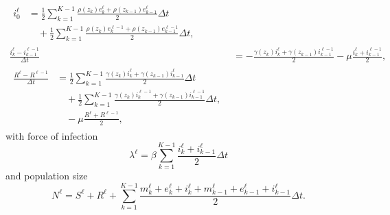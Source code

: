 \documentclass{jpmarticle}
\let\subequationsorig\subequations%
\let\endsubequationsorig\endsubequations%
\renewenvironment{subequations}{
  \subequationsorig
  \renewcommand{\theequation}{\theparentequation.\arabic{equation}}
}{
  \endsubequationsorig
}
\begin{document}
\begin{subequations}
\begin{align}
\begin{split}
      i_0^{\ell} &=
      \frac{1}{2} \sum_{k = 1}^{K - 1}
      \frac{\rho(z_k) e_k^{\ell} + \rho(z_{k - 1}) e_{k - 1}^{\ell}}{2}
      \Delta t
      \\ & \quad {}
      + \frac{1}{2} \sum_{k = 1}^{K - 1}
      \frac{\rho(z_k) e_k^{\ell - 1} + \rho(z_{k - 1}) e_{k - 1}^{\ell - 1}}{2}
      \Delta t,
    \end{split}
    \\
    \frac{i_k^{\ell} - i_{k - 1}^{\ell - 1}}{\Delta t} &=
    - \frac{\gamma(z_k) i_k^{\ell} + \gamma(z_{k - 1}) i_{k - 1}^{\ell - 1}}{2}
    - \mu \frac{i_k^{\ell} + i_{k - 1}^{\ell - 1}}{2},
    \\
    \begin{split}
      \frac{R^{\ell} - R^{\ell - 1}}{\Delta t} &=
      \frac{1}{2} \sum_{k = 1}^{K - 1}
      \frac{\gamma(z_k) i_k^{\ell} + \gamma(z_{k - 1}) i_{k - 1}^{\ell}}{2}
      \Delta t
      \\ & \quad {}
      + \frac{1}{2} \sum_{k = 1}^{K - 1}
      \frac{\gamma(z_k) i_k^{\ell - 1} + \gamma(z_{k - 1}) i_{k - 1}^{\ell - 1}}{2}
      \Delta t,
      \\ & \quad {}
      - \mu \frac{R^{\ell} + R^{\ell - 1}}{2},
    \end{split}
  \end{align}
  with force of infection
  \begin{equation}
    \lambda^{\ell} =
    \beta \sum_{k = 1}^{K - 1}
    \frac{i_k^{\ell} + i_{k - 1}^{\ell}}{2}
    \Delta t
  \end{equation}
  and population size
  \begin{equation}
    N^{\ell} =
    S^{\ell} + R^{\ell}
    + \sum_{k = 1}^{K - 1}
    \frac{m_k^{\ell} + e_k^{\ell} + i_k^{\ell} + m_{k - 1}^{\ell}
      + e_{k - 1}^{\ell} + i_{k - 1}^{\ell}}
    {2}
    \Delta t.
  \end{equation}
\end{subequations}
\end{document}
